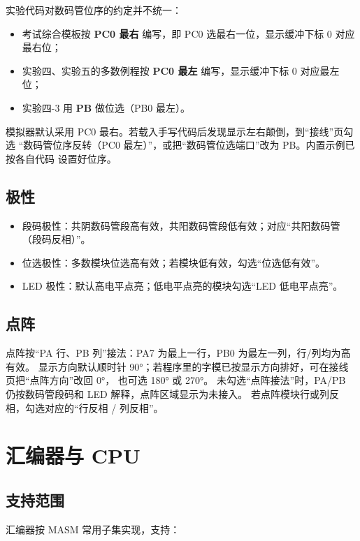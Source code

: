 \documentclass[11pt,a4paper]{ctexart}
\begin{document}
实验代码对数码管位序的约定并不统一：

\begin{itemize}
  \item 考试综合模板按 \textbf{PC0 最右} 编写，即 PC0 选最右一位，显示缓冲下标 0 对应最右位；
  \item 实验四、实验五的多数例程按 \textbf{PC0 最左} 编写，显示缓冲下标 0 对应最左位；
  \item 实验四-3 用 \textbf{PB} 做位选（PB0 最左）。
\end{itemize}

模拟器默认采用 PC0 最右。若载入手写代码后发现显示左右颠倒，到“接线”页勾选
“数码管位序反转（PC0 最左）”，或把“数码管位选端口”改为 PB。内置示例已按各自代码
设置好位序。

\subsection{极性}

\begin{itemize}
  \item 段码极性：共阴数码管段高有效，共阳数码管段低有效；对应“共阳数码管（段码反相）”。
  \item 位选极性：多数模块位选高有效；若模块低有效，勾选“位选低有效”。
  \item LED 极性：默认高电平点亮；低电平点亮的模块勾选“LED 低电平点亮”。
\end{itemize}

\subsection{点阵}

点阵按“PA 行、PB 列”接法：PA7 为最上一行，PB0 为最左一列，行/列均为高有效。
显示方向默认顺时针 90°；若程序里的字模已按显示方向排好，可在接线页把“点阵方向”改回 0°，
也可选 180° 或 270°。
未勾选“点阵接法”时，PA/PB 仍按数码管段码和 LED 解释，点阵区域显示为未接入。
若点阵模块行或列反相，勾选对应的“行反相 / 列反相”。

\section{汇编器与 CPU}

\subsection{支持范围}

汇编器按 MASM 常用子集实现，支持：
\end{document}
